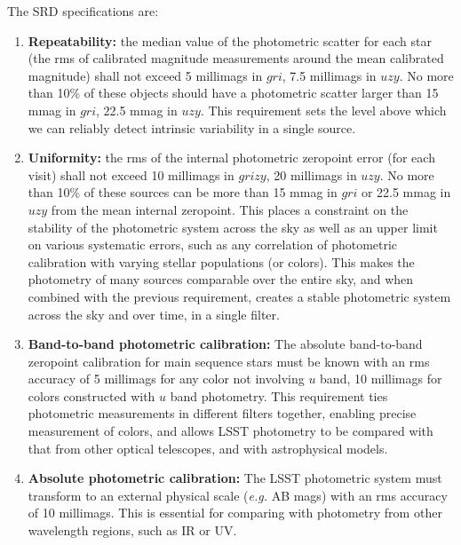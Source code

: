 \documentclass[12pt,preprint]{aastex}
\begin{document}
The SRD specifications are: 
\begin{enumerate}
\item{{\bf Repeatability:} the median value of the photometric scatter
for each star (the rms of calibrated magnitude measurements around the
mean calibrated magnitude) shall not exceed 5 millimags in $gri$, 7.5
millimags in $uzy$. No more than 10\% of these objects should have a photometric
scatter larger than 15 mmag in $gri$, 22.5 mmag in $uzy$.  This
requirement sets the level above which we can reliably detect intrinsic
variability in a single source. \label{repeatability_req}}

\item{{\bf Uniformity:} the rms of the internal photometric zeropoint
error (for each visit) shall not exceed 10 millimags in $grizy$, 20 millimags in $uzy$. 
No more than 10\% of these sources can be more than 15
mmag in $gri$ or 22.5 mmag in $uzy$ from the mean internal zeropoint.
This places a constraint on the stability of the photometric system
across the sky as well as an upper limit on various systematic
errors, such as any correlation of photometric calibration with
varying stellar populations (or colors). This makes the photometry of
many sources comparable over the entire sky, and when combined with
the previous requirement, creates a stable photometric system across
the sky and over time, in a single filter. \label{uniformity_req}}

\item{{\bf Band-to-band photometric calibration:} The absolute
band-to-band zeropoint calibration for main sequence stars must be
known with an rms accuracy of 5 millimags for any color not involving $u$
band, 10 millimags for colors constructed with $u$ band
photometry. This requirement ties photometric measurements in
different filters together, enabling precise measurement of colors, and
allows LSST photometry to be compared with that from other optical telescopes, and
with astrophysical models.
\label{color_req}}

\item{{\bf Absolute photometric calibration:} The LSST photometric
system must transform to an external physical scale ({\it e.g.} AB
mags) with an rms accuracy of 10 millimags.  This is essential for
comparing with photometry from other wavelength regions, such as IR
or UV.

\label{abs_req}}
\end{enumerate}
\end{document}
